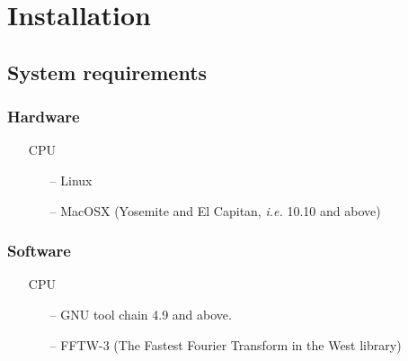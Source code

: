 \documentclass[a4paper,11pt]{article}
\begin{document}
\section{Installation}
\label{install}

\subsection{System requirements}
\label{sysreq}

\subsubsection{Hardware}
\label{hardware}

\begin{itemize}
	\item [CPU]
	\begin{itemize}
		\item[--] Linux
		\item[--] MacOSX (Yosemite and El Capitan, \textit{i.e.} 10.10 and above)
	\end{itemize}
\end{itemize}

\subsubsection{Software}
\label{soft}

\begin{itemize}
	\item [CPU]
	\begin{itemize}
		\item[--] GNU tool chain 4.9 and above.
		\item[--] FFTW-3 (The Fastest Fourier Transform in the West library)
	\end{itemize}
\end{itemize}
\end{document}
